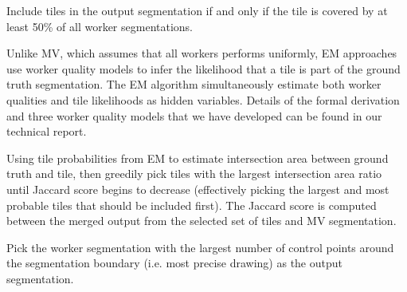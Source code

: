 \par \noindent Include tiles in the output segmentation if and only if the tile is covered by at least 50\% of all worker segmentations.

\par \noindent Unlike MV, which assumes that all workers performs uniformly, EM approaches use worker quality models to infer the likelihood that a tile is part of the ground truth segmentation. The EM algorithm simultaneously estimate both worker qualities and tile likelihoods as hidden variables. Details of the formal derivation and three worker quality models that we have developed can be found in our technical report.

\par \noindent Using tile probabilities from EM to estimate intersection area between ground truth and tile, then greedily pick tiles with the largest intersection area ratio until Jaccard score begins to decrease (effectively picking the largest and most probable tiles that should be included first). The Jaccard score is computed between the merged output from the selected set of tiles and MV segmentation.

\par \noindent Pick the worker segmentation with the largest number of control points around the segmentation boundary (i.e. most precise drawing) as the output segmentation.